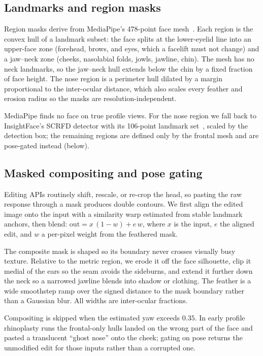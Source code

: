 \subsection{Landmarks and region masks}
\label{sec:masks}

Region masks derive from MediaPipe's 478-point face
mesh~\cite{lugaresi2019mediapipe,grishchenko2020attentionmesh}. Each region is the
convex hull of a landmark subset: the face splits at the lower-eyelid line into an
upper-face zone (forehead, brows, and eyes, which a facelift must not change) and a
jaw--neck zone (cheeks, nasolabial folds, jowls, jawline, chin). The mesh has no
neck landmarks, so the jaw--neck hull extends below the chin by a fixed fraction of
face height. The nose region is a perimeter hull dilated by a margin proportional
to the inter-ocular distance, which also scales every feather and erosion radius so
the masks are resolution-independent.

MediaPipe finds no face on true profile views. For the nose region we fall back to
InsightFace's SCRFD detector with its 106-point landmark
set~\cite{guo2022scrfd}, scaled by the detection box; the remaining regions are
defined only by the frontal mesh and are pose-gated instead (below).

\subsection{Masked compositing and pose gating}
\label{sec:composite}

Editing APIs routinely shift, rescale, or re-crop the head, so pasting the raw
response through a mask produces double contours. We first align the edited image
onto the input with a similarity warp estimated from stable landmark anchors, then
blend: $\mathrm{out} = x\,(1-w) + e\,w$, where $x$ is the input, $e$ the aligned
edit, and $w$ a per-pixel weight from the feathered mask.

The composite mask is shaped so its boundary never crosses visually busy texture.
Relative to the metric region, we erode it off the face silhouette, clip it medial
of the ears so the seam avoids the sideburns, and extend it further down the neck
so a narrowed jawline blends into shadow or clothing. The feather is a wide
smoothstep ramp over the signed distance to the mask boundary rather than a
Gaussian blur. All widths are inter-ocular fractions.

Compositing is skipped when the estimated yaw exceeds $0.35$. In early profile
rhinoplasty runs the frontal-only hulls landed on the wrong part of the face and
pasted a translucent ``ghost nose'' onto the cheek; gating on pose returns the
unmodified edit for those inputs rather than a corrupted one.

